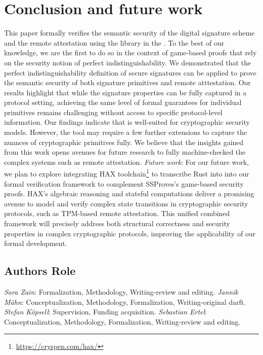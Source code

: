 \section{Conclusion and future work}
\label{sec:concl}
%
This paper formally verifies the semantic security of the digital signature scheme 
and the remote attestation using the \ssprove library in the \coq.
%
To the best of our knowledge, we are the first to do so in the context of game-based proofs that rely on
the security notion of perfect indistinguishability. 
%
We demonstrated that the perfect indistinguishability definition of secure signatures 
can be applied to prove the semantic security of both signature primitives and remote atttestation.
%
Our results highlight that while the signature properties can be fully captured in a protocol setting, 
achieving the same level of formal guarantees for individual primitives remains challenging without 
access to specific protocol-level information. 
%
Our findings indicate that \ssprove is well-suited for cryptographic security models. 
%
However, the tool may require a few further extensions to capture the nuances of cryptographic primitives fully. 
%
We believe that the insights gained from this work opens avenues for future research 
to fully machine-checked the complex systems such as remote attestation. 
%
\textit{Future work}:
For our future work, we plan to explore integrating HAX toolchain\footnote{\url{https://cryspen.com/hax/}}
to transcribe Rust into \coq
into our formal verification framework to complement SSProves's game-based security proofs. 
%
HAX's algebraic reasoning and stateful computations deliver a promising avenue to model and verify 
complex state transitions in cryptographic security protocols, such as TPM-based remote attestation.
%
This unified combined framework will precisely address both structural correctness and security 
properties in complex cryptographic protocols, improving the applicability of our formal development.  
%
\subsection{Authors Role}
\textit{Sara Zain}: Formalization, Methodology, Writing-review and editing.
%
\textit{Jannik M\"ahn}: Conceptualization, Methodology, Formalization, Writing-original darft.
%
\textit{Stefan K\"opsell}: Supervision, Funding acquisition.
%
\textit{Sebastian Ertel}: Conceptualization, Methodology, Formalization, Writing-review and editing.

